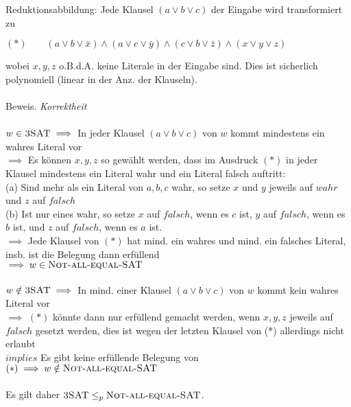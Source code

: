 Reduktionsabbildung: Jede Klausel  $(a \lor b \lor c)$ der Eingabe wird transformiert zu
\begin{center}
$(*)\qquad(a \lor b \lor \bar{x}) \land (a \lor c \lor \bar{y}) \land (c \lor b \lor \bar{z}) \land (x \lor y \lor z)$
\end{center}
wobei $x, y, z$ o.B.d.A. keine Literale in der Eingabe sind. Dies ist sicherlich polynomiell (linear in der Anz. der Klauseln).
\\ \ \\
Beweis. \textit{Korrektheit}\\ \ \\
$w \in \textsc{3SAT}\\ \implies$
In jeder Klausel $(a \lor b \lor c)$ von $w$ kommt mindestens ein wahres Literal vor\\$\implies$
Es können $x, y, z$ so gewählt werden, dass im Ausdruck $(*)$ in jeder Klausel mindestens ein Literal wahr und ein Literal falsch auftritt:\\
\null\quad (a) Sind mehr als ein Literal von $a, b, c$ wahr, so setze $x$ und $y$ jeweils auf $wahr$ und $z$ auf $falsch$\\
\null\quad (b) Ist nur eines wahr, so setze $x$ auf $falsch$, wenn es $c$ ist, $y$ auf $falsch$, wenn es $b$ ist, und $z$ auf $falsch$, wenn es $a$ ist.\\$\implies$
Jede Klausel von $(*)$ hat mind. ein wahres und mind. ein falsches Literal, insb. ist die Belegung dann erfüllend\\$\implies
w \in \textsc{Not-all-equal-SAT}$\\ \ \\
$w \notin \textsc{3SAT}\\ \implies$
In mind. einer Klausel $(a \lor b \lor c)$ von $w$ kommt kein wahres Literal vor\\$\implies$
$(*)$ könnte dann nur erfüllend gemacht werden, wenn $x, y, z$ jeweils auf $falsch$ gesetzt werden, dies ist wegen der letzten Klausel von (*) allerdings nicht erlaubt\\$implies$
Es gibt keine erfüllende Belegung von $(*)\\ \implies
w \notin \textsc{Not-all-equal-SAT}$\\ \ \\
Es gilt daher $\textsc{3SAT} \leq_p \textsc{Not-all-equal-SAT}$.